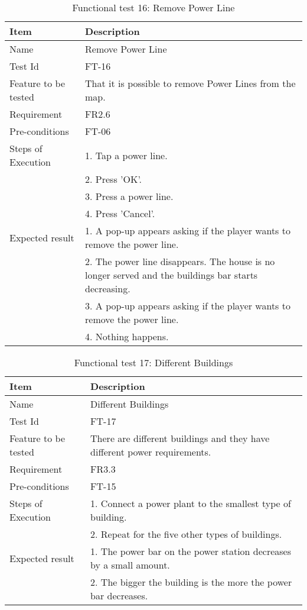 \begin{table}[H]
\centering
	\begin{tabular}{ l | p{8cm} }
		\hline
		\rowcolor{lightgray}
		{\bf Item} & {\bf Description} \\ \hline
		Name & Remove Power Line \\ 
		Test Id & FT-16 \\ 
		Feature to be tested & That it is possible to remove Power Lines from the map. \\ 
		Requirement & FR2.6 \\ 
		Pre-conditions & FT-06 \\ 
		Steps of Execution & 1. Tap a power line.  \\ 
		& 2. Press 'OK'. \\
		& 3. Press a power line. \\
		& 4. Press 'Cancel'. \\
		Expected result & 1. A pop-up appears asking if the player wants to remove the power line. \\ 
		& 2. The power line disappears. The house is no longer served and the buildings bar starts decreasing. \\
		& 3. A pop-up appears asking if the player wants to remove the power line. \\
		& 4. Nothing happens. \\
		\hline
	\end{tabular}
	\caption{Functional test 16: Remove Power Line}
\end{table}



\begin{table}[H]
\centering
	\begin{tabular}{ l | p{8cm} }
		\hline
		\rowcolor{lightgray}
		{\bf Item} & {\bf Description} \\ \hline
		Name & Different Buildings \\ 
		Test Id & FT-17 \\ 
		Feature to be tested & There are different buildings and they have different power requirements. \\ 
		Requirement & FR3.3 \\ 
		Pre-conditions & FT-15 \\ 
		Steps of Execution & 1. Connect a power plant to the smallest type of building. \\
		& 2. Repeat for the five other types of buildings. \\
		Expected result & 1. The power bar on the power station decreases by a small amount. \\
		& 2. The bigger the building is the more the power bar decreases. \\
		\hline
	\end{tabular}
	\caption{Functional test 17: Different Buildings}
\end{table}

